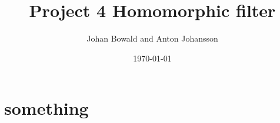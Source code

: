 \documentclass[a4paper]{article}
\title{Project 4 Homomorphic filter}
\author{Johan Bowald and Anton Johansson}
\date{\today}
\begin{document}
\maketitle

\section{something}

\end{document}
